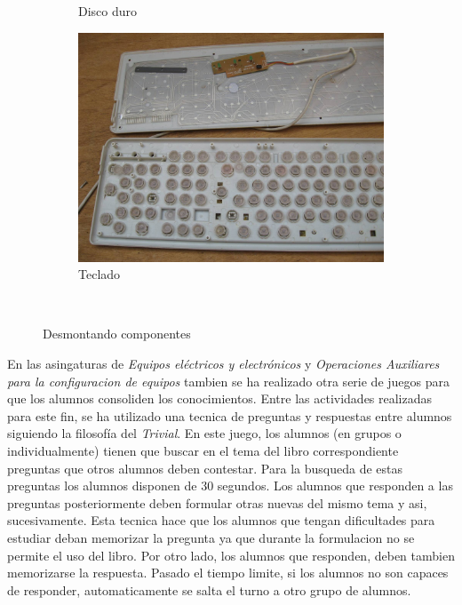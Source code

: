 \documentclass[spanish,12pt, a4paper,twoside]{paper}
\begin{document}
\begin{figure}
\begin{subfigure}[b]{0.3\textwidth}
        \caption{Disco duro}
    \end{subfigure}
    \begin{subfigure}[b]{0.3\textwidth}
        \includegraphics[width=\textwidth]{recursos/teclado.jpg}
        \caption{Teclado}
    \end{subfigure}
    ~ %
    \caption{Desmontando componentes}
\end{figure}
\FloatBarrier
\justify
En las asingaturas de \textit{Equipos eléctricos y electrónicos} y \textit{Operaciones Auxiliares para la configuracion de equipos} tambien se ha realizado otra serie de juegos para que los alumnos consoliden los conocimientos. Entre las actividades realizadas para este fin, se ha utilizado una tecnica de preguntas y respuestas entre alumnos siguiendo la filosofía del \textit{Trivial}. En este juego, los alumnos (en grupos o individualmente) tienen que buscar en el tema del libro correspondiente preguntas que otros alumnos deben contestar. Para la busqueda de estas preguntas los alumnos disponen de 30 segundos. Los alumnos que responden a las preguntas posteriormente deben formular otras nuevas del mismo tema y asi, sucesivamente. Esta tecnica hace que los alumnos que tengan dificultades para estudiar deban memorizar la pregunta ya que durante la formulacion no se permite el uso del libro. Por otro lado, los alumnos que responden, deben tambien memorizarse la respuesta. Pasado el tiempo limite, si los alumnos no son capaces de responder, automaticamente se salta el turno a otro grupo de alumnos.
\end{document}
